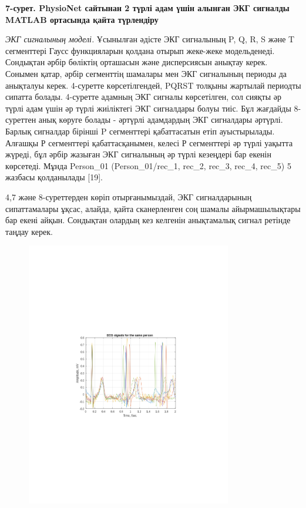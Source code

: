{{\bfseries 7-сурет. PhysioNet сайтынан 2 түрлі адам үшін алынған ЭКГ
сигналды MATLAB ортасында қайта түрлендіру}

\emph{ЭКГ сигналының моделі.} Ұсынылған әдісте ЭКГ сигналының P, Q, R, S
және T сегменттері Гаусс функцияларын қолдана отырып жеке-жеке
модельденеді. Сондықтан әрбір бөліктің орташасын және дисперсиясын
анықтау керек. Сонымен қатар, әрбір сегменттің шамалары мен ЭКГ
сигналының периоды да анықталуы керек. 4-суретте көрсетілгендей, PQRST
толқыны жартылай периодты сипатта болады. 4-суретте адамның ЭКГ сигналы
көрсетілген, сол сияқты әр түрлі адам үшін әр түрлі жиіліктегі ЭКГ
сигналдары болуы тиіс. Бұл жағдайды 8-суреттен анық көруге болады -
әртүрлі адамдардың ЭКГ сигналдары әртүрлі. Барлық сигналдар бірінші P
сегменттері қабаттасатын етіп ауыстырылады. Алғашқы Р сегменттері
қабаттасқанымен, келесі Р сегменттері әр түрлі уақытта жүреді, бұл әрбір
жазыған ЭКГ сигналының әр түрлі кезеңдері бар екенін көрсетеді. Мұнда
Person\_01 (Person\_01/rec\_1, rec\_2, rec\_3, rec\_4, rec\_5) 5 жазбасы
қолданылады {[}19{]}.

4,7 және 8-суреттерден көріп отырғанымыздай, ЭКГ сигналдарының
сипаттамалары ұқсас, алайда, қайта сканерленген соң шамалы
айырмашылықтары бар екені айқын. Сондықтан олардың кез келгенін
анықтамалық сигнал ретінде таңдау керек.

\begin{figure}[H]
	\centering
	\includegraphics[width=0.8\textwidth]{media/ict/image48}
	\caption*{}
\end{figure}


}
